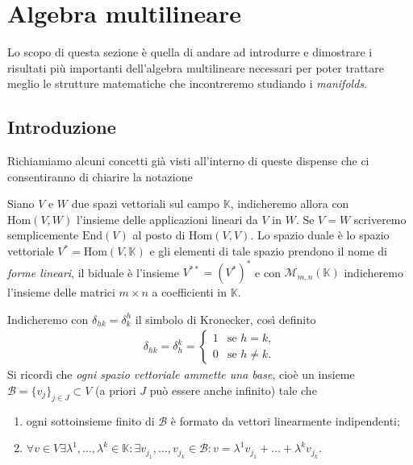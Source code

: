 \chapter{Algebra multilineare}

Lo scopo di questa sezione è quella di andare ad introdurre e dimostrare i risultati più importanti dell'algebra multilineare necessari per poter trattare meglio le strutture matematiche che incontreremo studiando i \emph{manifolds}.

\section{Introduzione}

Richiamiamo alcuni concetti già visti all'interno di queste dispense che ci consentiranno di chiarire la notazione
\begin{definition}
    Siano $V$ e $W$ due spazi vettoriali sul campo $\mathbb{K}$, indicheremo allora con $\text{Hom}(V, W)$ l'insieme delle applicazioni lineari da $V$ in $W$. Se $V = W$ scriveremo semplicemente $\text{End}(V)$ al posto di $\text{Hom}(V, V)$. 
    Lo spazio duale è lo spazio vettoriale $V^* = \text{Hom}(V, \mathbb{K})$ e gli elementi di tale spazio prendono il nome di \emph{forme lineari}, il biduale è l'insieme $V^{**} = (V^*)^*$ e con $\mathcal{M}_{m, n}(\mathbb{K})$ indicheremo l'insieme delle matrici $m \times n$ a coefficienti in $\mathbb{K}$.
\end{definition}
Indicheremo con $\delta_{hk} = \delta^h_k$ il simbolo di Kronecker, così definito
\begin{align}
    \delta_{hk} = \delta_h^k = \begin{cases}
        1 & \text{se } h = k, \\
        0 & \text{se } h \neq k.
    \end{cases}
\end{align}
Si ricordi che \emph{ogni spazio vettoriale ammette una base}, cioè un insieme $\mathcal{B} = \{ v_j \}_{j \in J} \subset V$ (a priori $J$ può essere anche infinito) tale che
\begin{enumerate}[label=\protect\circled{\arabic*}]
    \item ogni sottoinsieme finito di $\mathcal{B}$ è formato da vettori linearmente indipendenti;
    \item $\forall v \in V \exists \lambda^1, \ldots, \lambda^k \in \mathbb{K} : \exists v_{j_1}, \ldots, v_{j_k} \in \mathcal{B} : v = \lambda^1 v_{j_1} + \ldots + \lambda^k v_{j_k}$.
\end{enumerate}
